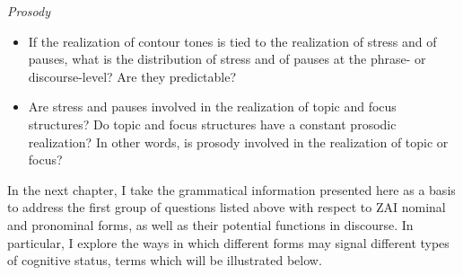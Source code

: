 \vspace{3mm}
\noindent \textit{Prosody}
\begin{itemize}
\item If the realization of contour tones is tied to the realization of stress and of pauses, what is the distribution of stress and of pauses at the phrase- or discourse-level? Are they predictable? 
\item Are stress and pauses involved in the realization of topic and focus structures? Do topic and focus structures have a constant prosodic realization? In other words, is prosody involved in the realization of topic or focus?
\end{itemize}


In the next chapter, I take the grammatical information presented here as a basis to address the first group of questions listed above with respect to ZAI nominal and pronominal forms, as well as their potential functions in discourse. In particular, I explore the ways in which different forms may signal different types of cognitive status, terms which will be illustrated below. 

